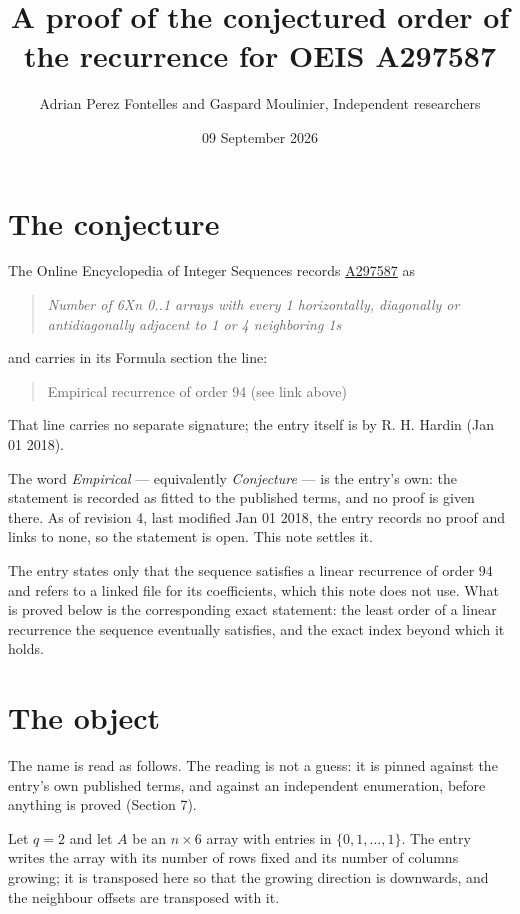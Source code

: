 \documentclass[11pt]{article}
\title{A proof of the conjectured order of the recurrence for OEIS A297587}
\author{Adrian Perez Fontelles and Gaspard Moulinier, Independent researchers}
\date{09 September 2026}
\theoremstyle{definition}
\begin{document}
\maketitle
\section{The conjecture}

The Online Encyclopedia of Integer Sequences records \href{https://oeis.org/A297587}{A297587} as

\begin{quote}\itshape Number of 6Xn 0..1 arrays with every 1 horizontally, diagonally or antidiagonally adjacent to 1 or 4 neighboring 1s\end{quote}

and carries in its Formula section the line:

\begin{quote}\ttfamily Empirical recurrence of order 94 (see link above)\end{quote}

That line carries no separate signature; the entry itself is by R. H. Hardin (Jan 01 2018).

The word {\itshape Empirical} --- equivalently {\itshape Conjecture} --- is the entry's own: the statement is recorded as fitted to the published terms, and no proof is given there. As of revision 4, last modified Jan 01 2018, the entry records no proof and links to none, so the statement is open. This note settles it.

The entry states only that the sequence satisfies a linear recurrence of order $94$ and refers to a linked file for its coefficients, which this note does not use. What is proved below is the corresponding exact statement: the least order of a linear recurrence the sequence eventually satisfies, and the exact index beyond which it holds.

\section{The object}

The name is read as follows. The reading is not a guess: it is pinned against the entry's own published terms, and against an independent enumeration, before anything is proved (Section 7).

Let $q = 2$ and let $A$ be an $n \times 6$ array with entries in $\{0,1,\dots,1\}$. The entry writes the array with its number of rows fixed and its number of columns growing; it is transposed here so that the growing direction is downwards, and the neighbour offsets are transposed with it.
\end{document}
